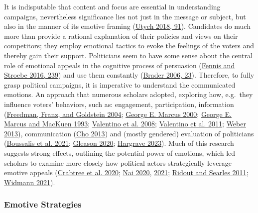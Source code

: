 \documentclass[a4paper,11pt]{article}
\begin{document}
It is indisputable that content and focus are essential in understanding campaigns, nevertheless significance lies not just in the message or subject, but also in the manner of its emotive framing (\protect\hyperlink{ref-utychNegativeAffectiveLanguage2018}{Utych 2018, 91}).
Candidates do much more than provide a rational explanation of their policies and views on their competitors; they employ emotional tactics to evoke the feelings of the voters and thereby gain their support. Politicians seem to have some sense about the central role of emotional appeals in the cognitive process of persuasion (\protect\hyperlink{ref-fennisPsychologyAdvertising2016}{Fennis and Stroebe 2016, 239}) and use them constantly (\protect\hyperlink{ref-braderCampaigningHeartsMinds2006}{Brader 2006, 23}). Therefore, to fully grasp political campaigns, it is imperative to understand the communicated emotions. An approach that numerous scholars adopted, exploring how, e.g.~they influence voters' behaviors, such as: engagement, participation, information (\protect\hyperlink{ref-freedmanCampaignAdvertisingDemocratic2004}{Freedman, Franz, and Goldstein 2004}; \protect\hyperlink{ref-marcusAffectiveIntelligencePolitical2000}{George E. Marcus 2000}; \protect\hyperlink{ref-marcusAnxietyEnthusiasmVote1993}{George E. Marcus and MacKuen 1993}; \protect\hyperlink{ref-valentinoWorriedCitizenGood2008}{Valentino et al. 2008}; \protect\hyperlink{ref-valentinoElectionNightAlright2011}{Valentino et al. 2011}; \protect\hyperlink{ref-weberEmotionsCampaignsPolitical2013}{Weber 2013}), communication (\protect\hyperlink{ref-choCampaignTonePolitical2013}{Cho 2013}) and (mostly gendered) evaluation of politicians (\protect\hyperlink{ref-boussalisGenderCandidateEmotional2021}{Boussalis et al. 2021}; \protect\hyperlink{ref-gleasonMerePresenceGender2020}{Gleason 2020}; \protect\hyperlink{ref-hargraveDoubleStandardGender2023}{Hargrave 2023}). Much of this research suggests strong effects, outlining the potential power of emotions, which led scholars to examine more closely how political actors strategically leverage emotive appeals (\protect\hyperlink{ref-crabtreeItNotOnly2020}{Crabtree et al. 2020}; \protect\hyperlink{ref-naiGoingNegativeWorldwide2020}{Nai 2020}, \protect\hyperlink{ref-naiFearLoathingPopulist2021}{2021}; \protect\hyperlink{ref-ridoutItMyCampaign2011}{Ridout and Searles 2011}; \protect\hyperlink{ref-widmannHowEmotionalAre2021}{Widmann 2021}).

\hypertarget{emotivestrategies}{%
\subsubsection{Emotive Strategies}\label{emotivestrategies}}
\end{document}
